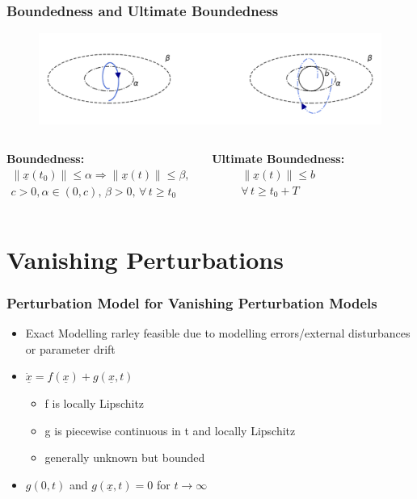 \documentclass[student, noshadow, lsr, english, aspectratio=169, t]{ITR_LSR_slides}
\begin{document}
\begin{frame}
	\frametitle{Boundedness and Ultimate Boundedness}
	\begin{figure}
		\centering
		\includegraphics[width=\textwidth]{ultimate_boundedness_rotated.pdf}
		\caption{}
		\label{fig:boundedness_vs_ultimate_boundedness}
	\end{figure}
	\vspace{-1cm}
	\begin{columns}[t,totalwidth=\textwidth]
		\textbf{Boundedness:}
		\begin{align*}
			\|\underline{x}(t_0)\| \leq \alpha \Rightarrow \|\underline{x}(t)\| \leq \beta,
			\\ c>0, \alpha\in(0,c),\, \beta>0,\,\forall\, t \geq t_0
		\end{align*}

		\textbf{Ultimate Boundedness:}
		\begin{align*}
			\|\underline{x}(t)\| \leq b 
			\\ \forall\, t \geq t_0+T
		\end{align*}
    \end{columns}
\end{frame}

\section{Vanishing Perturbations}
\begin{frame}
	\frametitle{Perturbation Model for Vanishing Perturbation Models}
	\begin{itemize}
		\item Exact Modelling rarley feasible due to modelling errors/external disturbances or parameter drift
		\item $\dot{\underline{x}}=f(\underline{x})+g(\underline{x},t)$
		\begin{itemize}
			\item f is locally Lipschitz
			\item g is piecewise continuous in t and locally Lipschitz
			\item generally unknown but bounded
		\end{itemize}
		\item $g(0,t)$ and $g(\underline{x},t)=0$ for $t\rightarrow\infty$
	\end{itemize}
\end{frame}
\end{document}
